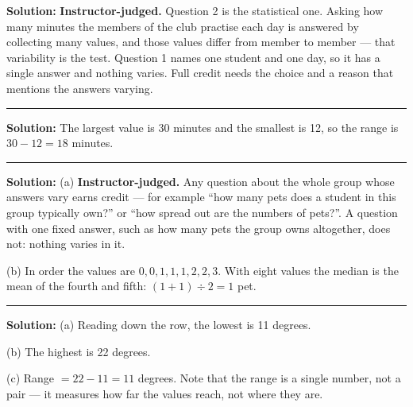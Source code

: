 \documentclass[12pt]{article}
\begin{document}



\textbf{Solution:} \textbf{Instructor-judged.} Question 2 is the statistical
one. Asking how many minutes the members of the club practise each day is
answered by collecting many values, and those values differ from member to
member --- that variability is the test. Question 1 names one student and one
day, so it has a single answer and nothing varies. Full credit needs the choice
and a reason that mentions the answers varying.

\vspace{0.25cm}\noindent\rule{\linewidth}{0.2pt}\vspace{0.25cm}


\textbf{Solution:} The largest value is 30 minutes and the smallest is 12, so
the range is $30 - 12 = 18$ minutes. 

\vspace{0.25cm}\noindent\rule{\linewidth}{0.2pt}\vspace{0.25cm}


\textbf{Solution:} (a) \textbf{Instructor-judged.} Any question about the whole
group whose answers vary earns credit --- for example ``how many pets does a
student in this group typically own?'' or ``how spread out are the numbers of
pets?''. A question with one fixed answer, such as how many pets the group owns
altogether, does not: nothing varies in it.

(b) In order the values are $0, 0, 1, 1, 1, 2, 2, 3$. With eight values the
median is the mean of the fourth and fifth: $(1 + 1) \div 2 = 1$
pet. 

\vspace{0.25cm}\noindent\rule{\linewidth}{0.2pt}\vspace{0.25cm}


\textbf{Solution:} (a) Reading down the row, the lowest is 11 degrees. 

(b) The highest is 22 degrees. 

(c) Range $= 22 - 11 = 11$ degrees. Note that the range is a single number, not
a pair --- it measures how far the values reach, not where they
are. 
\end{document}
